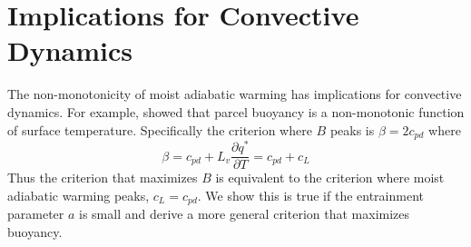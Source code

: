 \documentclass[]{ametsocV6.1}
\begin{document}
\section{Implications for Convective Dynamics}
The non-monotonicity of moist adiabatic warming has implications for convective dynamics. For example, \cite{romps2016} showed that parcel buoyancy is a non-monotonic function of surface temperature. Specifically the criterion where $B$ peaks is $\beta = 2c_{pd}$ where
\begin{equation}
\beta = c_{pd} + L_v\frac{\partial q^*}{\partial T} = c_{pd} + c_L
\end{equation}
Thus the \cite{romps2016} criterion that maximizes $B$ is equivalent to the criterion where moist adiabatic warming peaks, $c_L = c_{pd}$. We show this is true if the entrainment parameter $a$ is small and derive a more general criterion that maximizes buoyancy. 
\end{document}
